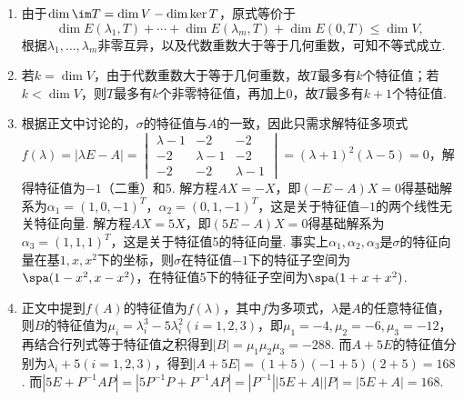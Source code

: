 \begin{enumerate}
    \item 由于$\dim\im T=\dim V-\dim\ker T$，原式等价于
          \[ \dim E(\lambda_1,T)+\cdots+\dim E(\lambda_m,T)+\dim E(0,T)\leqslant\dim V, \]
          根据$\lambda_1,\ldots,\lambda_m$非零互异，以及代数重数大于等于几何重数，可知不等式成立.

    \item 若$k=\dim V$，由于代数重数大于等于几何重数，故$T$最多有$k$个特征值；若$k<\dim V$，则$T$最多有$k$个非零特征值，再加上0，故$T$最多有$k+1$个特征值.

    \item 根据正文中讨论的，$\sigma$的特征值与$A$的一致，因此只需求解特征多项式$f(\lambda)=|\lambda E-A|=\begin{vmatrix}
                  \lambda-1 & -2        & -2        \\
                  -2        & \lambda-1 & -2        \\
                  -2        & -2        & \lambda-1
              \end{vmatrix}=(\lambda+1)^2(\lambda-5)=0$，解得特征值为$-1$（二重）和5. 解方程$AX=-X$，即$(-E-A)X=0$得基础解系为$\alpha_1=(1,0,-1)^T$，$\alpha_2=(0,1,-1)^T$，这是关于特征值$-1$的两个线性无关特征向量. 解方程$AX=5X$，即$(5E-A)X=0$得基础解系为$\alpha_3=(1,1,1)^T$，这是关于特征值5的特征向量. 事实上$\alpha_1,\alpha_2,\alpha_3$是$\sigma$的特征向量在基$1,x,x^2$下的坐标，则$\sigma$在特征值$-1$下的特征子空间为$\spa(1-x^2,x-x^2)$，在特征值5下的特征子空间为$\spa(1+x+x^2)$.

    \item 正文中提到$f(A)$的特征值为$f(\lambda)$，其中$f$为多项式，$\lambda$是$A$的任意特征值，则$B$的特征值为$\mu_i=\lambda_i^3-5\lambda_i^2(i=1,2,3)$，即$\mu_1=-4,\mu_2=-6,\mu_3=-12$，再结合行列式等于特征值之积得到$|B|=\mu_1\mu_2\mu_3=-288$. 而$A+5E$的特征值分别为$\lambda_i+5(i=1,2,3)$，得到$|A+5E|=(1+5)(-1+5)(2+5)=168$. 而$|5E+P^{-1}AP|=|5P^{-1}P+P^{-1}AP|=|P^{-1}||5E+A||P|=|5E+A|=168$.


\end{enumerate}
